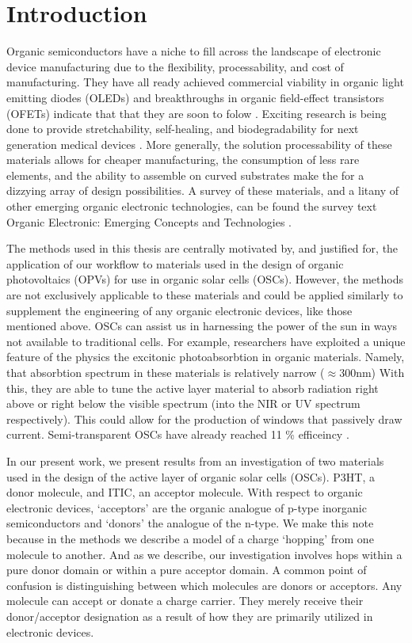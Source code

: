 \chapter{Introduction} 
Organic semiconductors have a niche to fill across the landscape of electronic
device manufacturing due to the flexibility, processability, and cost of manufacturing. They have all ready
achieved commercial viability in organic light emitting
diodes (OLEDs) \cite{Song2020} and breakthroughs in organic field-effect transistors (OFETs)
indicate that that they are soon to folow \cite{Chen2020}. Exciting research is being done to provide stretchability, self-healing, and biodegradability for 
next generation medical devices \cite{Brutting2006}.
More generally, the solution processability of these materials allows for
cheaper manufacturing, the consumption of less rare elements, 
and the ability to assemble on curved substrates make the for a dizzying array of design possibilities. 
A survey of these materials, and a litany of
other emerging organic electronic technologies, can be found the survey text 
Organic Electronic: Emerging Concepts and Technologies
\cite{FabioCicoiraEditor2013}. 

The methods used in this thesis are centrally motivated by, and justified for, 
the application of our workflow to materials
used in the design of organic photovoltaics (OPVs) for use in organic solar cells (OSCs). However, the methods are
not exclusively applicable to these materials and could be applied similarly to  supplement the engineering of any organic
electronic devices, like those mentioned above. 
OSCs can assist us in harnessing the power of the sun in ways not available to traditional cells. 
For example, researchers have exploited a unique feature of the physics the excitonic photoabsorbtion in 
organic materials.  Namely, that absorbtion spectrum
in these materials is relatively narrow ($\approx$300nm)
With this, they are able to tune the active layer material to absorb radiation right above or right below the
visible spectrum (into the NIR or UV spectrum respectively). This 
could allow for the production of windows that passively draw current. Semi-transparent OSCs have already
reached 11 \% efficeincy \cite{Brabec2020}. 

In our present work, we present results from an investigation of two materials
used in the design of the active layer of organic solar cells (OSCs). P3HT, a
donor molecule, and ITIC, an acceptor molecule. With respect to organic electronic devices, `acceptors' are the
organic analogue of p-type inorganic semiconductors and `donors' the analogue
of the n-type. We make this note because in the methods we describe a model of
a charge `hopping' from one molecule to another. And as we describe, our
investigation involves hops within a pure donor domain or within a pure
acceptor domain. A common point of confusion is distinguishing between which
molecules are donors or acceptors.
Any molecule can accept or donate a charge carrier.
They merely receive their donor/acceptor designation as a result of how they
are primarily utilized in electronic devices. 

